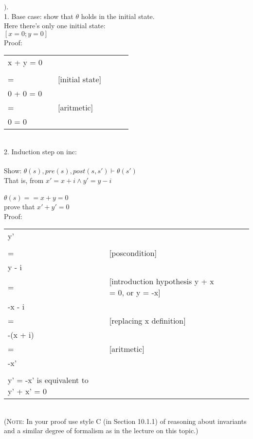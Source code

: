 \documentclass{article}
\begin{document}
$)$.
\\
1. Base case: show that $\theta$ holds in the initial state. \\
Here there's only one initial state: \\
$[x = 0;y = 0 ]$ \\ 
Proof: \\
\begin{tabular}{l ll lll}
     x + y = 0 \\ &    &  \\
     = &   & [initial state] \\
     0 + 0 = 0 & & \\
     = &   & [aritmetic] \\
     0 = 0  \\
\end{tabular} \\
2. Induction step on inc: \\
\\
Show: $\theta (s), pre(s), post(s, s') \vdash \theta(s')$ \\
That is, from $x' = x + i \wedge y' = y - i$ \\
\\
$ \theta (s) == x + y = 0 $ \\
prove that $ x' + y' = 0 $ \\
Proof: \\
\begin{tabular}{l ll lll}
     y' \\ &    &  \\
     = &   & [poscondition] \\
     y - i & & \\
     = &   & [introduction hypothesis y + x = 0, or y = -x] \\
     -x - i \\
     = & & [replacing x definition] \\ 
     -(x + i) \\
     = & & [aritmetic] \\
     -x' \\
     \\
    y' = -x' is equivalent to y' + x' = 0 \\
\end{tabular} \\
\noindent (\textsc{Note:} In your proof use style C (in Section 10.1.1) of reasoning about invariants and a similar degree of formalism as in the lecture on this topic.)

\vspace{12pt}
\end{document}
